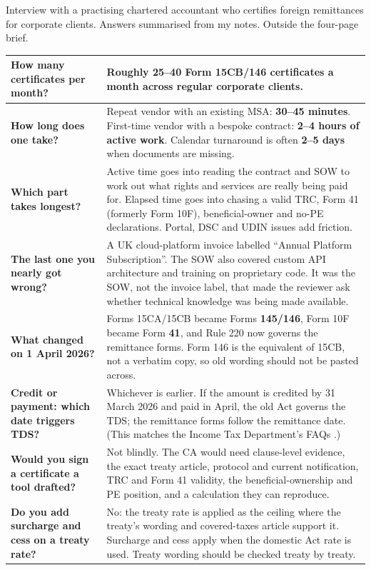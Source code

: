 \documentclass[10pt,a4paper]{article}
\begin{document}
{\small\color{muted}Interview with a practising chartered accountant who certifies foreign remittances for corporate clients. Answers summarised from my notes. Outside the four-page brief.\par}
\vspace{4pt}
\begin{tabularx}{\linewidth}{@{}>{\bfseries\RaggedRight}p{44mm}L@{}}
\toprule
How many certificates per month? & Roughly \textbf{25--40 Form 15CB/146 certificates a month} across regular corporate clients.\\\midrule
How long does one take? & Repeat vendor with an existing MSA: \textbf{30--45 minutes}. First-time vendor with a bespoke contract: \textbf{2--4 hours of active work}. Calendar turnaround is often \textbf{2--5 days} when documents are missing.\\\midrule
Which part takes longest? & Active time goes into reading the contract and SOW to work out what rights and services are really being paid for. Elapsed time goes into chasing a valid TRC, Form 41 (formerly Form 10F), beneficial-owner and no-PE declarations. Portal, DSC and UDIN issues add friction.\\\midrule
The last one you nearly got wrong? & A UK cloud-platform invoice labelled ``Annual Platform Subscription''. The SOW also covered custom API architecture and training on proprietary code. It was the SOW, not the invoice label, that made the reviewer ask whether technical knowledge was being made available.\\\midrule
What changed on 1 April 2026? & Forms 15CA/15CB became Forms \textbf{145/146}, Form 10F became Form \textbf{41}, and Rule 220 now governs the remittance forms. Form 146 is the equivalent of 15CB, not a verbatim copy, so old wording should not be pasted across.\\\midrule
Credit or payment: which date triggers TDS? & Whichever is earlier. If the amount is credited by 31 March 2026 and paid in April, the old Act governs the TDS; the remittance forms follow the remittance date. (This matches the Income Tax Department's FAQs \cite{faqtds,faqforms}.)\\\midrule
Would you sign a certificate a tool drafted? & Not blindly. The CA would need clause-level evidence, the exact treaty article, protocol and current notification, TRC and Form 41 validity, the beneficial-ownership and PE position, and a calculation they can reproduce.\\\midrule
Do you add surcharge and cess on a treaty rate? & No: the treaty rate is applied as the ceiling where the treaty's wording and covered-taxes article support it. Surcharge and cess apply when the domestic Act rate is used. Treaty wording should be checked treaty by treaty.\\
\bottomrule
\end{tabularx}
\end{document}
